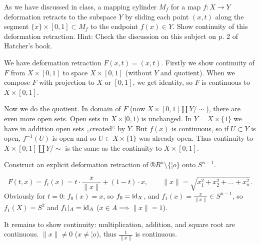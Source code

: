 \documentclass[12pt]{article}					%
\begin{document}
\begin{priklad}[1.]
	As we have discussed in class, a mapping cylinder $M_f$ for a map $f: X \rightarrow Y$ deformation retracts to the subspace $Y$ by sliding each point $(x, t)$ along the segment $\{x\} \times [0, 1] \subset M_f$ to the endpoint $f(x) \in Y$. Show continuity of this deformation retraction. Hint: Check the discussion on this subject on p. 2 of Hatcher’s book.

	\begin{dukazin}
		We have deformation retraction $F(x, t) = (x, t)$. Firstly we show continuity of $F$ from $X \times [0, 1]$ to space $X \times [0, 1]$ (without $Y$ and quotient). When we compose $F$ with projection to $X$ or $[0, 1]$, we get identity, so $F$ is continuous to $X \times [0, 1]$.

		Now we do the quotient. In domain of $F$ (now $X \times [0, 1] \coprod Y / \sim$), there are even more open sets. Open sets in $X \times [0, 1)$ is unchanged. In $Y = X \times \{1\}$ we have in addition open sets „created“ by $Y$. But $f(x)$ is continuous, so if $U \subset Y$ is open, $f^{-1}(U)$ is open and so $U \subset X \times \{1\}$ was already open. Thus continuity to $X \times [0, 1] \coprod Y / \sim$ is the same as the continuity to $X \times [0, 1]$.
	\end{dukazin}
\end{priklad}

\begin{priklad}[2.]
	Construct an explicit deformation retraction of $®R^n \setminus \{¦o\}$ onto $S^{n-1}$.

	\begin{reseni}
		$$ F(t, x) = f_t(x) = t·\frac{x}{\|x\|} + (1 - t)·x, \qquad \|x\| = \sqrt{x_1^2 + x_2^2 + … + x_n^2}. $$
		Obviously for $t=0$: $f_0(x) = x$, so $f_0 = \operatorname{id}_X$, and $f_1(x) = \frac{x}{\|x\|} \in S^{n-1}$, so $f_1(X) = S^2$ and $f_1|_A = \operatorname{id}_A$ ($x \in A \implies \|x\| = 1$).

		It remains to show continuity: multiplication, addition, and square root are continuous. $\|x\| ≠ 0$ ($x ≠ ¦o$), thus $\frac{1}{\|x\|}$ is continuous.
	\end{reseni}
\end{priklad}

\break
\end{document}
